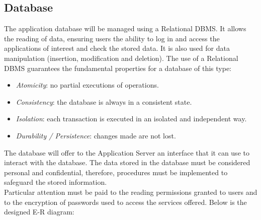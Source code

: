 \subsection{Database}
The application database will be managed using a Relational DBMS.
It allows the reading of data, ensuring users the ability to log in and access the applications of interest and check the stored data.
It is also used for data manipulation (insertion, modification and deletion).
The use of a Relational DBMS guarantees the fundamental properties for a database of this type:
\begin{itemize}
  \item \textit{Atomicity}: no partial executions of operations.
  \item \textit{Consistency}: the database is always in a consistent state.
  \item \textit{Isolation}: each transaction is executed in an isolated and independent way.
  \item \textit{Durability / Persistence}: changes made are not lost.
\end{itemize}
The database will offer to the Application Server an interface that it can use to interact with the database.
The data stored in the database must be considered personal and confidential, therefore, procedures must be implemented to safeguard the stored information.\\
Particular attention must be paid to the reading permissions granted to users and to the encryption of passwords used to access the services offered.
Below is the designed E-R diagram:

